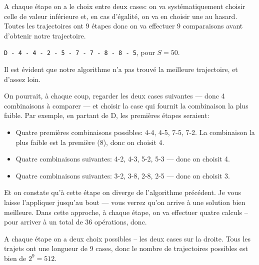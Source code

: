 \documentclass[12pt]{article}
\begin{document}
	\begin{MaReponse}
		\begin{alphenum}
			\item A chaque étape on a le choix entre deux cases: on va systématiquement choisir celle de valeur inférieure et, en cas d'égalité, on va en choisir une au hasard. Toutes les trajectoires ont 9 étapes donc on va effectuer 9 comparaisons avant d'obtenir notre trajectoire.
			\item \texttt{D - 4 - 4 - 2 - 5 - 7 - 7 - 8 - 8 - 5}, pour $S = 50$.
			\item Il est évident que notre algorithme n'a pas trouvé la meilleure trajectoire, et d'assez loin.
			\item On pourrait, à chaque coup, regarder les deux cases suivantes --- donc 4 combinaisons à comparer --- et choisir la case qui fournit la combinaison la plus faible. Par exemple, en partant de D, les premières étapes seraient:
			\begin{itemize}
				\item Quatre premières combinaisons possibles: 4-4, 4-5, 7-5, 7-2. La combinaison la plus faible est la première (8), donc on choisit 4.
				\item Quatre combinaisons suivantes: 4-2, 4-3, 5-2, 5-3 --- donc on choisit 4.
				\item Quatre combinaisons suivantes: 3-2, 3-8, 2-8, 2-5 --- donc on choisit 3.
			\end{itemize}
			Et on constate qu'à cette étape on diverge de l'algorithme précédent. Je vous laisse l'appliquer jusqu'au bout --- vous verrez qu'on arrive à une solution bien meilleure. Dans cette approche, à chaque étape, on va effectuer quatre calculs -- pour arriver à un total de 36 opérations, donc.
			\item A chaque étape on a deux choix possibles -- les deux cases sur la droite. Tous les trajets ont une longueur de 9 cases, donc le nombre de trajectoires possibles est bien de $2^9 = 512$.
		\end{alphenum}
	\end{MaReponse}
	
\end{document}
